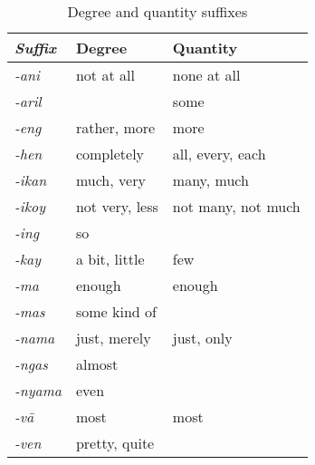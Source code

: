 \begin{table}[tp]\centering
\caption{Degree and quantity suffixes}
\begin{tabu} to .75
\toprule\tableheaderfont
Suffix
	& Degree
	& Quantity
	\\

\toprule
	
-ani %
	& not at all
	& none at all
	\\

-aril %
	& 
	& some
	\\

-eng %
	& rather, more
	& more
	\\
	
-hen %
	& completely
	& all, every, each
	\\

-ikan %
	& much, very
	& many, much
	\\
	
-ikoy %
	& not very, less
	& not many, not much
	\\
	
-ing %
	& so
	&
	\\
	
-kay %
	& a bit, little
	& few
	\\

-ma %
	& enough
	& enough
	\\

-mas %
	& some kind of
	&
	\\

-nama %
	& just, merely
	& just, only
	\\
	
-ngas %
	& almost
	&
	\\

-nyama %
	& even
	&
	\\
	
-vā %
	& most
	& most
	\\

-ven %
	& pretty, quite
	&
	\\

\bottomrule
\end{tabu}
\label{tab:quantifiers}
\end{table}

